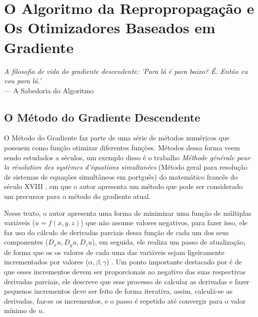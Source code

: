 
\chapter{O Algoritmo da Repropropagação e Os Otimizadores Baseados em Gradiente}
\label{cap:retropropagacao-gradiente}

\begin{flushright}
\textit{A filosofia de vida do gradiente descendente: 'Para lá é para baixo? É. Então eu vou para lá.'} \\
--- A Sabedoria do Algoritmo
\end{flushright}



\section{O Método do Gradiente Descendente}

O Método do Gradiente faz parte de uma série de métodos numéricos que possuem como função otimizar diferentes funções. Métodos dessa forma veem sendo estudados a séculos, um exemplo disso é o trabalho \textit{M{\'e}thode g{\'e}n{\'e}rale pour la r{\'e}solution des syst{\`e}mes d'{\'e}quations simultan{\'e}es} (Método geral para resolução de sistemas de equações simultâneos em portguês) do matemático francês do século XVIII \textcite{CauchyMetodoDoGradiente}, em que o autor apresenta um método que pode ser considerado um precursor para o método do gradiente atual.

Nesse texto, o autor apresenta uma forma de minimizar uma função de múltiplas variáveis ($u=f(x,y,z)$) que não assume valores negativos, para fazer isso, ele faz uso do cálculo de derivadas parciais dessa função de cada um dos seus componentes ($D_x u, D_y u, D_z u$), em seguida, ele realiza um passo de atualização, de forma que os os valores de cada uma das variáveis sejam ligeiramente incrementados por valores ($\alpha, \beta, \gamma$) \parencite{CauchyMetodoDoGradiente}. Um ponto importante destacado por \textcite{CauchyMetodoDoGradiente} é de que esses incrementos devem ser proporcionais ao negativo das suas respectivas derivadas parciais, ele descreve que esse processo de calcular as derivadas e fazer pequenos incrementos deve ser feito de forma iterativa, assim, calculá-se as derivadas, faz-se os incrementos, e o passo é repetido até convergir para o valor mínimo de $u$.

